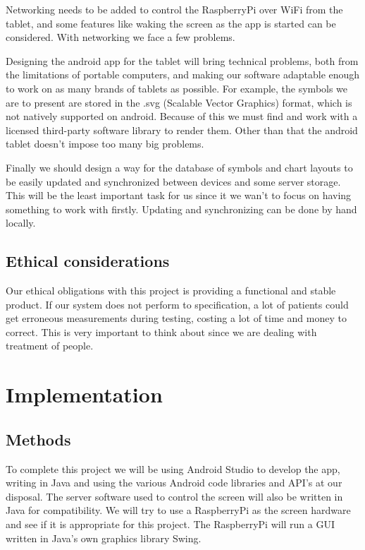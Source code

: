 \documentclass[12pt,a4paper,notitlepage]{report}
\begin{document}
Networking needs to be added to control the RaspberryPi over WiFi from the tablet, and some features like waking the screen as the app is started can be considered. With networking we face a few problems. %

Designing the android app for the tablet will bring technical problems, both from the limitations of portable computers, and making our software adaptable enough to work on as many brands of tablets as possible. For example, the symbols we are to present are stored in the .svg (Scalable Vector Graphics) format, which is not natively supported on android. Because of this we must find and work with a licensed third-party software library to render them. Other than that the android tablet doesn't impose too many big problems. %

Finally we should design a way for the database of symbols and chart layouts to be easily updated and synchronized between devices and some server storage. This will be the least important task for us since it we wan't to focus on having something to work with firstly. Updating and synchronizing can be done by hand locally.

\section{Ethical considerations} %
Our ethical obligations with this project is providing a functional and stable product. If our system does not perform to specification, a lot of patients could get erroneous measurements during testing, costing a lot of time and money to correct. This is very important to think about since we are dealing with treatment of people.

\chapter{Implementation}
\section{Methods}
To complete this project we will be using Android Studio to develop the app, writing in Java and using the various Android code libraries and API's at our disposal. The server software used to control the screen will also be written in Java for compatibility. We will try to use a RaspberryPi as the screen hardware and see if it is appropriate for this project. The RaspberryPi will run a GUI written in Java's own graphics library Swing. 
\end{document}
